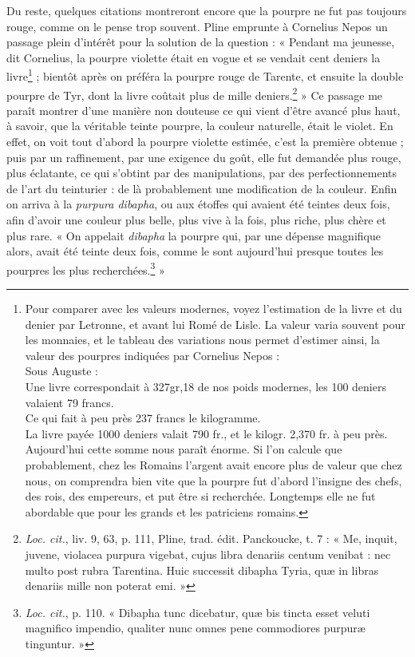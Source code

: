 \documentclass[a4paper, 11pt, oneside, polutonikogreek, french]{article}
\begin{document}
Du reste, quelques citations montreront encore que la pourpre ne fut pas toujours rouge, comme on le pense trop souvent. Pline emprunte à Cornelius Nepos un passage plein d'intérêt pour la solution de la question : « Pendant ma jeunesse, dit Cornelius, la pourpre violette était en vogue et se vendait cent deniers la livre\footnote{Pour comparer avec les valeurs modernes, voyez l'estimation de la livre et du denier par Letronne, et avant lui Romé de Lisle.  
La valeur varia souvent pour les monnaies, et le tableau des variations nous permet d'estimer ainsi, la valeur des pourpres indiquées par Cornelius Nepos :\\\hspace*{5mm}Sous Auguste :\\\hspace*{5mm}Une livre correspondait à 327gr,18 de nos poids modernes, les 100 deniers valaient 79 francs.\\\hspace*{5mm}Ce qui fait à peu près 237 francs le kilogramme.\\\hspace*{5mm}La livre payée 1000 deniers valait 790 fr., et le kilogr. 2,370 fr. à peu près.\\\hspace*{5mm}Aujourd'hui cette somme nous paraît énorme. Si l'on calcule que probablement, chez les Romains l'argent avait encore plus de valeur que chez nous, on comprendra bien vite que la pourpre fut d'abord l'insigne des chefs, des rois, des empereurs, et put être si recherchée. Longtemps elle ne fut abordable que pour les grands et les patriciens romains.} ; bientôt après on préféra la pourpre rouge de Tarente, et ensuite la double pourpre de Tyr, dont la livre coûtait plus de mille deniers.\footnote{\emph{Loc. cit.}, liv. 9, 63, p. 111, Pline, trad. édit. Panckoucke, t. 7 : « Me, inquit, juvene, violacea purpura vigebat, cujus libra denariis centum venibat : nec multo post rubra Tarentina. Huic successit dibapha Tyria, quæ in libras denariis mille non poterat emi. »} » Ce passage me paraît montrer d'une manière non douteuse ce qui vient d'être avancé plus haut, à savoir, que la véritable teinte pourpre, la couleur naturelle, était le violet. En effet, on voit tout d'abord la pourpre violette estimée, c'est la première obtenue ; puis par un raffinement, par une exigence du goût, elle fut demandée plus rouge, plus éclatante, ce qui s'obtint par des manipulations, par des perfectionnements de l'art du teinturier : de là probablement une modification de la couleur. Enfin on arriva à la \emph{purpura dibapha}, ou aux étoffes qui avaient été teintes deux fois, afin d'avoir une couleur plus belle, plus vive à la fois, plus riche, plus chère et plus rare. « On appelait \emph{dibapha} la pourpre qui, par une dépense magnifique alors, avait été teinte deux fois, comme le sont aujourd'hui presque toutes les pourpres les plus recherchées.\footnote{\emph{Loc. cit.}, p. 110. « Dibapha tunc dicebatur, quæ bis tincta esset veluti magnifico impendio, qualiter nunc omnes pene commodiores purpuræ tinguntur. »} »
\end{document}
